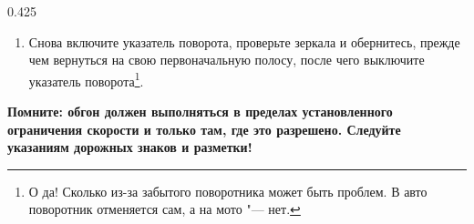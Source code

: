 \begin{langblock}{0.425}
\begin{rus}
\begin{enumerate}[noitemsep]
			\item Снова включите указатель поворота, проверьте зеркала и обернитесь, прежде чем вернуться на свою первоначальную полосу, после чего выключите указатель поворота\footnote{О да! Сколько из-за забытого поворотника может быть проблем. В авто поворотник отменяется сам, а на мото "--- нет.}.
			
		\end{enumerate}
		{
			\bfseries
			Помните: обгон должен выполняться в пределах установленного ограничения скорости и только там, где это разрешено. Следуйте указаниям дорожных знаков и разметки!
		}
\end{rus}
\end{langblock}






